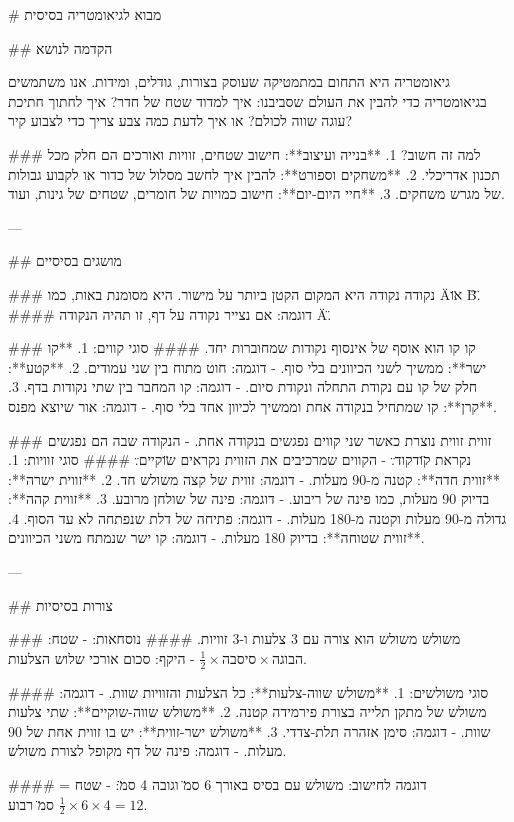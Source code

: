 # מבוא לגיאומטריה בסיסית

## הקדמה לנושא

גיאומטריה היא התחום במתמטיקה שעוסק בצורות, גודלים, ומידות. אנו משתמשים בגיאומטריה כדי להבין את העולם שסביבנו: איך למדוד שטח של חדר? איך לחתוך חתיכת עוגה שווה לכולם? או איך לדעת כמה צבע צריך כדי לצבוע קיר?

### למה זה חשוב?
1. **בנייה ועיצוב**: חישוב שטחים, זוויות ואורכים הם חלק מכל תכנון אדריכלי.
2. **משחקים וספורט**: להבין איך לחשב מסלול של כדור או לקבוע גבולות של מגרש משחקים.
3. **חיי היום-יום**: חישוב כמויות של חומרים, שטחים של גינות, ועוד.

---

## מושגים בסיסיים

### נקודה
נקודה היא המקום הקטן ביותר על מישור. היא מסומנת באות, כמו \"A\" או \"B\".
#### דוגמה:
אם נצייר נקודה על דף, זו תהיה הנקודה \"A\".

### קו
קו הוא אוסף של אינסוף נקודות שמחוברות יחד.
#### סוגי קווים:
1. **קו ישר**: ממשיך לשני הכיוונים בלי סוף.
   - דוגמה: חוט מתוח בין שני עמודים.
2. **קטע**: חלק של קו עם נקודת התחלה ונקודת סיום.
   - דוגמה: קו המחבר בין שתי נקודות בדף.
3. **קרן**: קו שמתחיל בנקודה אחת וממשיך לכיוון אחד בלי סוף.
   - דוגמה: אור שיוצא מפנס.

### זווית
זווית נוצרת כאשר שני קווים נפגשים בנקודה אחת. 
- הנקודה שבה הם נפגשים נקראת \"קודקוד\".
- הקווים שמרכיבים את הזווית נקראים \"שוקיים\".
#### סוגי זוויות:
1. **זווית חדה**: קטנה מ-90 מעלות.
   - דוגמה: זווית של קצה משולש חד.
2. **זווית ישרה**: בדיוק 90 מעלות, כמו פינה של ריבוע.
   - דוגמה: פינה של שולחן מרובע.
3. **זווית קהה**: גדולה מ-90 מעלות וקטנה מ-180 מעלות.
   - דוגמה: פתיחה של דלת שנפתחה לא עד הסוף.
4. **זווית שטוחה**: בדיוק 180 מעלות.
   - דוגמה: קו ישר שנמתח משני הכיוונים.

---

## צורות בסיסיות

### משולש
משולש הוא צורה עם 3 צלעות ו-3 זוויות. 
#### נוסחאות:
- שטח: $\frac{1}{2} \times הבסיס \times הגובה$
- היקף: סכום אורכי שלוש הצלעות.

#### סוגי משולשים:
1. **משולש שווה-צלעות**: כל הצלעות והזוויות שוות.
   - דוגמה: משולש של מתקן תלייה בצורת פירמידה קטנה.
2. **משולש שווה-שוקיים**: שתי צלעות שוות.
   - דוגמה: סימן אזהרה תלת-צדדי.
3. **משולש ישר-זווית**: יש בו זווית אחת של 90 מעלות.
   - דוגמה: פינה של דף מקופל לצורת משולש.

#### דוגמה לחישוב:
משולש עם בסיס באורך 6 ס\"מ וגובה 4 ס\"מ:
- שטח = $\frac{1}{2} \times 6 \times 4 = 12$ ס\"מ רבוע.

